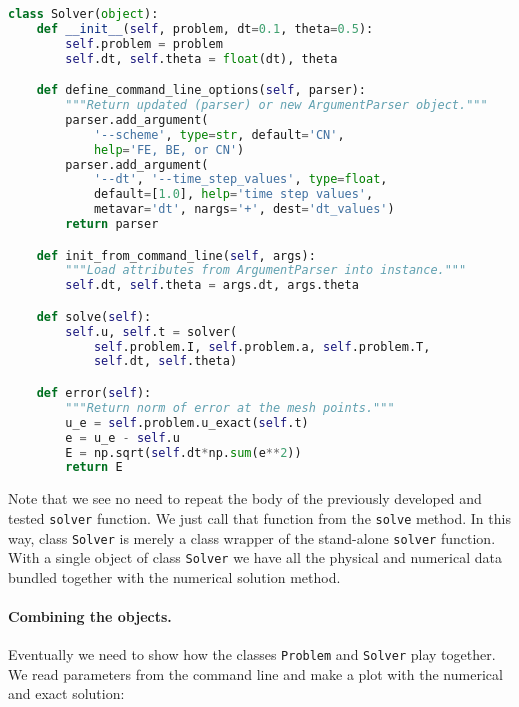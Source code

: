 \documentclass[graybox,sectrefs,envcountresetchap,open=right,final]{svmonodo}
\begin{document}
\begin{lstlisting}[language=Python,style=blue1_bluegreen]
class Solver(object):
    def __init__(self, problem, dt=0.1, theta=0.5):
        self.problem = problem
        self.dt, self.theta = float(dt), theta

    def define_command_line_options(self, parser):
        """Return updated (parser) or new ArgumentParser object."""
        parser.add_argument(
            '--scheme', type=str, default='CN',
            help='FE, BE, or CN')
        parser.add_argument(
            '--dt', '--time_step_values', type=float,
            default=[1.0], help='time step values',
            metavar='dt', nargs='+', dest='dt_values')
        return parser

    def init_from_command_line(self, args):
        """Load attributes from ArgumentParser into instance."""
        self.dt, self.theta = args.dt, args.theta

    def solve(self):
        self.u, self.t = solver(
            self.problem.I, self.problem.a, self.problem.T,
            self.dt, self.theta)

    def error(self):
        """Return norm of error at the mesh points."""
        u_e = self.problem.u_exact(self.t)
        e = u_e - self.u
        E = np.sqrt(self.dt*np.sum(e**2))
        return E
\end{lstlisting}
Note that we see no need to repeat the body of the previously
developed and tested \texttt{solver} function. We just call that function from
the \texttt{solve} method.  In this way, class \texttt{Solver} is merely a class wrapper
of the stand-alone \texttt{solver} function. With a single object of class \texttt{Solver}
we have all the physical and numerical data bundled together with the numerical
solution method.


\paragraph{Combining the objects.}
Eventually we need to show how the classes \texttt{Problem} and \texttt{Solver}
play together. We read parameters from the command line and make a
plot with the numerical and exact solution:
\end{document}
